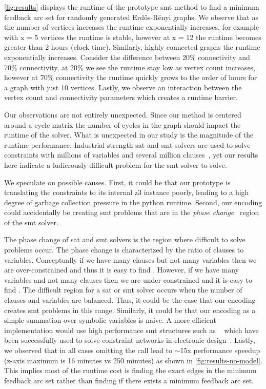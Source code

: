 \autoref{fig:results} displays the runtime of the prototype \ac{smt} method to
find a minimum feedback arc set for randomly generated Erd\H{o}s-R\'{e}nyi
graphs. We observe that as the number of vertices increases the runtime
exponentially increases, for example with x = 5 vertices the runtime is stable,
however at x = 12 the runtime becomes greater than 2 hours (clock time).
Similarly, highly connected graphs the runtime exponentially increases. Consider
the difference between 20\% connectivity and 70\% connectivity, at 20\% we see
the runtime stay low as vertex count increases, however at 70\% connectivity the
runtime quickly grows to the order of hours for a graph with just 10 vertices.
Lastly, we observe an interaction between the vertex count and connectivity
parameters which creates a runtime barrier.

Our observations are not entirely unexpected. Since our method is centered
around a cycle matrix the number of cycles in the graph should impact the
runtime of the solver. What is unexpected in our study is the magnitude of the
runtime performance. Industrial strength \ac{sat} and \ac{smt} solvers are used
to solve constraints with millions of variables and several million
clauses~\cite{10.5555/1550723}, yet our results here indicate a ludicrously
difficult problem for the \ac{smt} solver to solve.

We speculate on possible causes. First, it could be that our prototype is
translating the constraints to its internal z3 instance poorly, leading to a
high degree of garbage collection pressure in the python runtime. Second, our
encoding could accidentally be creating \ac{smt} problems that are in the
\emph{phase change}~\cite{Gent94thesat} region of the \ac{smt} solver.

The phase change of \ac{sat} and \ac{smt} solvers is the region where difficult
to solve problems occur. The phase change is characterized by the ratio of
clauses to variables. Conceptually if we have many clauses but not many
variables then we are over-constrained and thus it is easy to find .
However, if we have many variables and not many clauses then we are
under-constrained and it is easy to find . The difficult region for a
\ac{sat} or \ac{smt} solver occurs when the number of clauses and variables are
balanced. Thus, it could be the case that our encoding creates \ac{smt} problems
in this range. Similarly, it could be that our encoding as a simple summation
over symbolic variables is naive. A more efficient implementation would use high
performance \ac{smt} structures such as ~\cite{BarFT-SMTLIB}
which have been successfully used to solve constraint networks in electronic
design~\cite{10.5555/1550723}. Lastly, we observed that in all cases omitting
the  call lead to $\sim$15x performance speedup (z-axis maximum is
16 minutes vs 250 minutes) as shown in \autoref{fig:results-no-model}. This
implies most of the runtime cost is finding the exact edges in the minimum
feedback arc set rather than finding if there exists a minimum feedback arc set.

